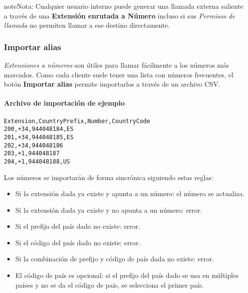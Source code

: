 \documentclass[letterpaper,10pt,spanish]{sphinxmanual}
\begin{document}
\begin{notice}{note}{Nota:}
Cualquier usuario interno puede generar una llamada externa saliente a través de una \textbf{Extensión enrutada a Número} incluso si sus \emph{Permisos de llamada} no permiten llamar a ese destino directamente.
\end{notice}


\subsubsection{Importar alias}
\label{administration_portal/client/vpbx/extensions:import-aliases}
\emph{Extensiones a números} son útiles para llamar fácilmente a los números más marcados. Como cada cliente suele tener una lista con números frecuentes, el botón \textbf{Importar alias} permite importarlos a través de un archivo CSV.
\paragraph{Archivo de importación de ejemplo}

\begin{Verbatim}[commandchars=\\\{\}]
Extension,CountryPrefix,Number,CountryCode
200,+34,944048184,ES
201,+34,944048185,ES
202,+34,944048186
203,+1,944048187
204,+1,944048188,US
\end{Verbatim}

Los números se importarán de forma sincrónica siguiendo estas reglas:
\begin{itemize}
\item {} 
Si la extensión dada ya existe y apunta a un número: el número se actualiza.

\item {} 
Si la extensión dada ya existe y no apunta a un número: error.

\item {} 
Si el prefijo del país dado no existe: error.

\item {} 
Si el código del país dado no existe: error.

\item {} 
Si la combinación de prefijo y código de país dada no existe: error.

\item {} 
El código de país es opcional: si el prefijo del país dado se usa en múltiples países y no se da el código de país, se selecciona el primer país.

\end{itemize}
\end{document}
